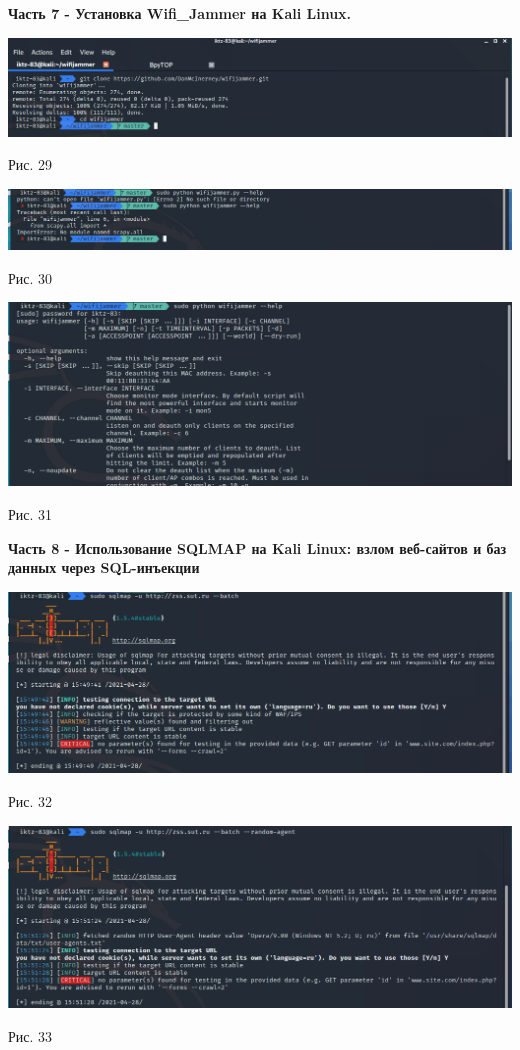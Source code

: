 \documentclass[a4paper,14pt]{extarticle}
\begin{document}
    \textbf{Часть 7 - Установка Wifi\_Jammer на Kali Linux.}
    \begin{center}
        
        \includegraphics[scale=0.4]{pics/29.png}

        Рис. 29 

        \includegraphics[scale=0.4]{pics/30.png}

        Рис. 30

        \includegraphics[scale=0.4]{pics/31.png}

        Рис. 31 

    \end{center}

    \textbf{Часть 8 - Использование SQLMAP на Kali Linux: взлом веб-сайтов и
баз данных через SQL-инъекции}
    \begin{center}
        \includegraphics[scale=0.4]{pics/32.png}

        Рис. 32 

        \includegraphics[scale=0.4]{pics/33.png}

        Рис. 33 

    \end{center}
\end{document}
